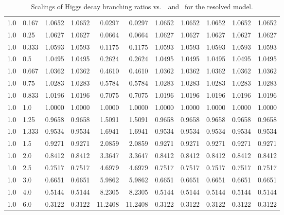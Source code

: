 \begin{table}[h!]
\begin{tabular}{ll rrrrrrrrr}
   1.0  & 0.167  & 1.0652 & 1.0652 & 0.0297 & 0.0297 & 1.0652 & 1.0652 & 1.0652 & 1.0652 & 1.0652 \\
   1.0  & 0.25   & 1.0627 & 1.0627 & 0.0664 & 0.0664 & 1.0627 & 1.0627 & 1.0627 & 1.0627 & 1.0627 \\
   1.0  & 0.333  & 1.0593 & 1.0593 & 0.1175 & 0.1175 & 1.0593 & 1.0593 & 1.0593 & 1.0593 & 1.0593 \\
   1.0  & 0.5    & 1.0495 & 1.0495 & 0.2624 & 0.2624 & 1.0495 & 1.0495 & 1.0495 & 1.0495 & 1.0495 \\
   1.0  & 0.667  & 1.0362 & 1.0362 & 0.4610 & 0.4610 & 1.0362 & 1.0362 & 1.0362 & 1.0362 & 1.0362 \\
   1.0  & 0.75   & 1.0283 & 1.0283 & 0.5784 & 0.5784 & 1.0283 & 1.0283 & 1.0283 & 1.0283 & 1.0283 \\
   1.0  &  0.833 & 1.0196 & 1.0196 & 0.7075 & 0.7075 & 1.0196 & 1.0196 & 1.0196 & 1.0196 & 1.0196 \\
   1.0  & 1.0    & 1.0000 & 1.0000 & 1.0000 & 1.0000 & 1.0000 & 1.0000 & 1.0000 & 1.0000 & 1.0000 \\
   1.0  & 1.25   & 0.9658 & 0.9658 & 1.5091 & 1.5091 & 0.9658 & 0.9658 & 0.9658 & 0.9658 & 0.9658 \\
   1.0  & 1.333  & 0.9534 & 0.9534 & 1.6941 & 1.6941 & 0.9534 & 0.9534 & 0.9534 & 0.9534 & 0.9534 \\
   1.0  & 1.5    & 0.9271 & 0.9271 & 2.0859 & 2.0859 & 0.9271 & 0.9271 & 0.9271 & 0.9271 & 0.9271 \\
   1.0  & 2.0    & 0.8412 & 0.8412 & 3.3647 & 3.3647 & 0.8412 & 0.8412 & 0.8412 & 0.8412 & 0.8412 \\
   1.0  & 2.5    & 0.7517 & 0.7517 & 4.6979 & 4.6979 & 0.7517 & 0.7517 & 0.7517 & 0.7517 & 0.7517 \\
   1.0  & 3.0    & 0.6651 & 0.6651 & 5.9862 & 5.9862 & 0.6651 & 0.6651 & 0.6651 & 0.6651 & 0.6651 \\
   1.0  & 4.0    & 0.5144 & 0.5144 & 8.2305 & 8.2305 & 0.5144 & 0.5144 & 0.5144 & 0.5144 & 0.5144 \\
   1.0  & 6.0    & 0.3122 & 0.3122 & 11.2408 & 11.2408 & 0.3122 & 0.3122 & 0.3122 & 0.3122 & 0.3122 \\\hline
    \end{tabular}
    \caption{Scalings of Higgs decay branching ratios vs.\ \Ct\ and \ for the resolved model.}\label{tab:brscalingK6_1}
 \end{table}

